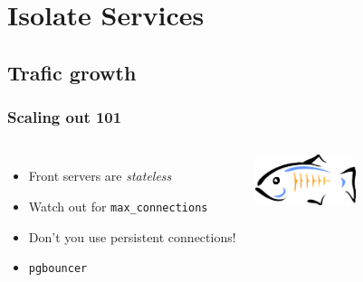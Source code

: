 \documentclass[english]{beamer}
\begin{document}
\section{Isolate Services}
\subsection{Trafic growth}
\frame{\tableofcontents[currentsubsection]}

\begin{frame}[fragile]
  \frametitle{Scaling out 101}

  \vfill

\begin{columns}[c]

  \begin{itemize}
   \item<1-> Front servers are \textit{stateless}
   \item<2-> Watch out for \texttt{max\_connections}
   \item<2-> Don't you use persistent connections!
   \item<3-> \texttt{pgbouncer}
  \end{itemize}  

\includegraphics[height=4em]{bouncer.png}
\end{columns}
\end{frame}


\end{document}
